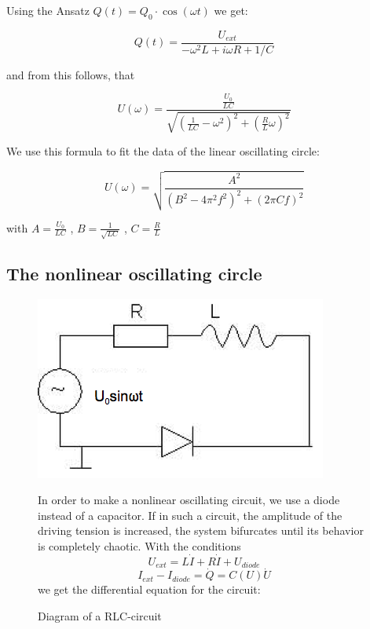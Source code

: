 Using the Ansatz $Q(t) = Q_0 \cdot\cos(\omega t)$ we get:

$$Q(t) = \frac{U_{ext}}{-\omega^2L+i\omega R + 1/C}$$

and from this follows, that

$$U(\omega) = \frac{ \frac{U_0}{LC} }{ \sqrt{ (\frac{1}{LC} - \omega^2 )^2+ (\frac{R}{L}\omega)^2}}$$

We use this formula to fit the data of the linear oscillating circle:

\begin{equation} U(\omega) = \sqrt{\frac{A^2}{(B^2-4\pi^2f^2)^2 + (2\pi Cf)^2}} \end{equation}

with  $A=\frac{U_0}{LC}$ ,  $B=\frac{1}{\sqrt{LC}}$ ,  $C=\frac{R}{L}$

\subsection{The nonlinear oscillating circle}
\begin{figure}[H]
\begin{minipage}{0.5\textwidth}
\includegraphics[width=\textwidth]{Bilder/nlcirc.png}
\caption{Diagram of a RLC-circuit}
\end{minipage}
\begin{minipage}{0.5\textwidth}
In order to make a nonlinear oscillating circuit, we use a diode instead of a capacitor. If in such a circuit, the amplitude of the driving tension is increased, the system bifurcates until its behavior is completely chaotic. With the conditions
$$U_{ext} = L\dot I + R\dot I + U_{diode}$$
$$I_{ext}-I_{diode} = \dot Q = C(U)\dot U$$
we get the differential equation for the circuit:
\end{minipage}
\end{figure}

